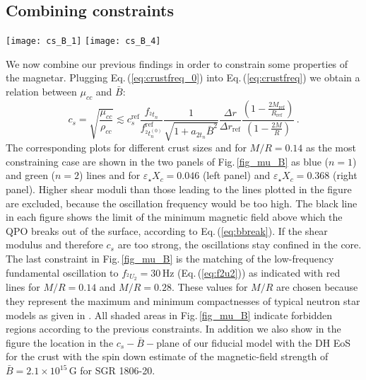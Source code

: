 \documentclass[useAMS,usenatbib]{mnras}
\begin{document}
\subsection{Combining constraints}

%
\begin{figure*}
\texttt{[image: cs\_B\_1]}
\texttt{[image: cs\_B\_4]}
\caption{Constraints on the $c_{s}-\bar B-$plane obtained from the 
magneto-elastic QPOs. The frequencies of the resonant high-frequency QPOs have 
to be below the observed frequencies for $^2t_1$ (blue lines) and $^2t_2$ (green 
lines). For better visibility we only show the strongest constrain, i.e. for 
$M/R=0.14$, for the high frequency QPOs.
The magnetic field has to be strong enough to break out of the crust. 
The threshold is given by the black lines. The two red lines indicate the 
frequency of $^2U_2$ matched to $30\,$Hz for maximum and minimum 
compactness $M/R$ for typical neutron star models. Shaded areas are excluded 
from the possible parameter space to explain the observations.}
\label{fig_mu_B}
\end{figure*}
%
We now combine our previous findings in order to constrain some properties 
of the magnetar. Plugging Eq.\,(\ref{eq:crustfreq_0}) into 
Eq.\,(\ref{eq:crustfreq}) we obtain a relation between $\mu_{cc}$ and $\bar B$: 
\begin{equation}
 c_s=\sqrt{\frac{\mu_{cc}}{\rho_{cc}}}\lesssim 
 c_s^\mathrm{ref} \frac{f_{^2t_n}}{f^\mathrm{ref}_{^2t_n^{(0)}}}
 \frac{1}{\sqrt{1+a_{2t_n} \bar B^2}}
 \frac{\Delta r}{\Delta r_\mathrm{ref}}
 \frac{\left(1-\frac{2M_\mathrm{ref}}{R_\mathrm{ref}}\right)}{ 
\left(1-\frac{2M }{R}\right)}\,.
\end{equation}
The 
corresponding plots 
for different crust sizes and for $M/R=0.14$ as the most constraining case are 
shown in the two panels of 
Fig.\,\ref{fig_mu_B} as blue ($n=1$) and green ($n=2$) lines and for 
$\varepsilon_\star X_c=0.046$
(left panel) and $\varepsilon_\star X_c=0.368$ (right panel). Higher shear 
moduli than those leading to the lines plotted in the figure are excluded, 
because the oscillation frequency would be too high.  The black line in 
each figure shows the limit of the minimum magnetic field above which the QPO 
breaks out of the surface, according to Eq.\,(\ref{eq:bbreak}). If the shear 
modulus and therefore $c_s$ are too strong, the oscillations stay confined in 
the core. The last constraint in Fig.\,\ref{fig_mu_B} is the matching of the 
low-frequency fundamental oscillation to $f_{^2U_2}=30\,$Hz 
(Eq.\,(\ref{eq:f2u2})) as indicated with red lines for $M/R=0.14$ and 
$M/R=0.28$. These values for $M/R$ are chosen because  they represent the 
maximum and minimum compactnesses of typical neutron star models as given in 
\cite{Sotani2008}. All shaded areas in Fig.\,\ref{fig_mu_B} indicate forbidden 
regions according to the previous constraints. In addition we also show in the 
figure the location in the $c_s-\bar B-$plane of our fiducial model with the DH 
EoS for the crust with the spin down estimate of the magnetic-field strength of 
$\bar B=2.1\times10^{15}\,$G for SGR 1806-20. 
\end{document}
